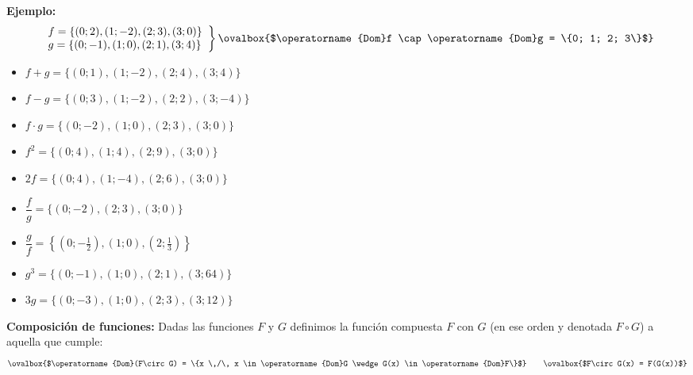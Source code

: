 \documentclass[11pt,a4paper]{article}
\begin{document}
\medskip
\textbf{Ejemplo:}
\[
\left.
\begin{array}{l}
f = \{(0;2), (1;-2), (2;3), (3;0)\}\\
g = \{(0;-1), (1;0), (2;1), (3;4)\}
\end{array}
\right\}
\ovalbox{$\operatorname{Dom}f \cap \operatorname{Dom}g = \{0; 1; 2; 3\}$}
\]
\begin{minipage}[t]{0.485\textwidth}
\begin{itemize}
  \item $f + g = \{(0;1), (1;-2), (2;4), (3;4)\}$
  \item $f - g = \{(0;3), (1;-2), (2;2), (3;-4)\}$
  \item $f\cdot g = \{(0;-2), (1;0), (2;3), (3;0)\}$
  \item $f^2 = \{(0;4), (1;4), (2;9), (3;0)\}$
  \item $2f = \{(0;4), (1;-4), (2;6), (3;0)\}$
\end{itemize}
\end{minipage}\hfill
\begin{minipage}[t]{0.485\textwidth}
\begin{itemize}
  \item $\dfrac{f}{g} = \{(0;-2), (2;3), (3;0)\}$
  \item $\dfrac{g}{f} = \left\{\left(0;-\tfrac{1}{2}\right), (1;0), \left(2;\tfrac{1}{3}\right)\right\}$
  \item $g^3 = \{(0;-1), (1;0), (2;1), (3;64)\}$
  \item $3g = \{(0;-3), (1;0), (2;3), (3;12)\}$
\end{itemize}
\end{minipage}

\medskip
\textbf{Composición de funciones:} Dadas las funciones $F$ y $G$ definimos la función
compuesta $F$ con $G$ (en ese orden y denotada $F\circ G$) a aquella que cumple:
\[
\ovalbox{$\operatorname{Dom}(F\circ G) = \{x \,/\, x \in \operatorname{Dom}G \wedge G(x) \in \operatorname{Dom}F\}$}
\qquad
\ovalbox{$F\circ G(x) = F(G(x))$}
\]

\begin{center}
\end{center}
\end{document}
